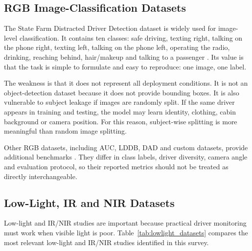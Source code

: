 \documentclass[11pt,a4paper]{article}
\let\oldsubsection\subsection
\renewcommand{\subsection}{\Needspace{6\baselineskip}\oldsubsection}
\begin{document}
\subsection{RGB Image-Classification Datasets}

The State Farm Distracted Driver Detection dataset is widely used for image-level classification. It contains ten classes: safe driving, texting right, talking on the phone right, texting left, talking on the phone left, operating the radio, drinking, reaching behind, hair/makeup and talking to a passenger \parencite{kaggleStateFarm}. Its value is that the task is simple to formulate and easy to reproduce: one image, one label.

The weakness is that it does not represent all deployment conditions. It is not an object-detection dataset because it does not provide bounding boxes. It is also vulnerable to subject leakage if images are randomly split. If the same driver appears in training and testing, the model may learn identity, clothing, cabin background or camera position. For this reason, subject-wise splitting is more meaningful than random image splitting.

Other RGB datasets, including AUC, LDDB, DAD and custom datasets, provide additional benchmarks \parencite{eraqi2019driver,li2022,wu2024}. They differ in class labels, driver diversity, camera angle and evaluation protocol, so their reported metrics should not be treated as directly interchangeable.

\subsection{Low-Light, IR and NIR Datasets}

Low-light and IR/NIR studies are important because practical driver monitoring must work when visible light is poor. Table~\ref{tab:lowlight_datasets} compares the most relevant low-light and IR/NIR studies identified in this survey.
\end{document}
